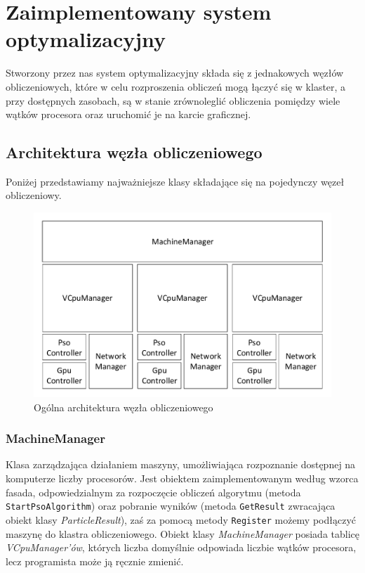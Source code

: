 \documentclass[12pt, twoside, openany, abstract=on]{report}
\theoremstyle{definition}
\begin{document}

\chapter{Zaimplementowany system optymalizacyjny}

Stworzony przez nas system optymalizacyjny składa się z jednakowych węzłów obliczeniowych, które w celu rozproszenia obliczeń mogą łączyć się w klaster, a przy dostępnych zasobach, są w stanie zrównoleglić obliczenia pomiędzy wiele wątków procesora oraz uruchomić je na karcie graficznej.


\section{Architektura węzła obliczeniowego}

Poniżej przedstawiamy najważniejsze klasy składające się na pojedynczy węzeł obliczeniowy. 

\begin{figure}[H]
    \centering
    \includegraphics[scale=0.7]{WezlaArch.pdf} 
 \caption{Ogólna architektura węzła obliczeniowego}
\end{figure}

\subsection{MachineManager}
Klasa zarządzająca działaniem maszyny, umożliwiająca rozpoznanie dostępnej na komputerze liczby procesorów. Jest obiektem zaimplementowanym według wzorca fasada, odpowiedzialnym za rozpoczęcie obliczeń algorytmu (metoda \texttt{StartPsoAlgorithm}) oraz pobranie wyników (metoda \texttt{GetResult} zwracająca obiekt klasy \textit{ParticleResult}), zaś za pomocą metody \texttt{Register} możemy podłączyć maszynę do klastra obliczeniowego. Obiekt klasy \textit{MachineManager} posiada tablicę \textit{VCpuManager'ów}, których liczba domyślnie odpowiada liczbie wątków procesora, lecz programista może ją ręcznie zmienić.
\end{document}
